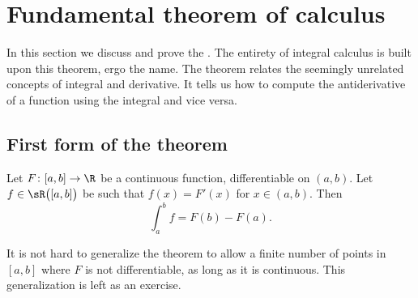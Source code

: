 \section{Fundamental theorem of calculus}
\label{sec:ftc}



In this section we discuss and prove the
\emph{}.
The entirety of integral calculus is built upon this theorem,
ergo the name.
The theorem relates the seemingly unrelated concepts of integral and
derivative.  It tells us how to compute the antiderivative of a function
using the integral and vice versa.

\subsection{First form of the theorem}

\begin{thm} \label{thm:FTCv1}
Let $F \colon [a,b] \to \R$ be a continuous function, differentiable
on $(a,b)$.  Let $f \in \sR\bigl([a,b]\bigr)$ be such that $f(x) = F'(x)$ for $x \in
(a,b)$.  Then
\begin{equation*}
\int_a^b f = F(b)-F(a) .
\end{equation*}
\end{thm}

It is not hard to generalize the theorem to allow a finite number of points
in $[a,b]$ where $F$ is not differentiable, as long as it is continuous.
This generalization is left as an exercise.


